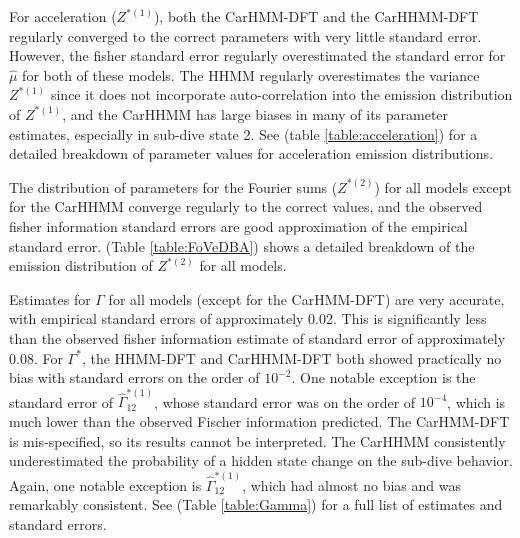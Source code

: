 For acceleration ($Z^{*(1)}$), both the CarHMM-DFT and the CarHHMM-DFT regularly converged to the correct parameters with very little standard error. However, the fisher standard error regularly overestimated the standard error for $\hat \mu$ for both of these models. 
The HHMM regularly overestimates the variance $Z^{*(1)}$ since it does not incorporate auto-correlation into the emission distribution of $Z^{*(1)}$, and the CarHHMM has large biases in many of its parameter estimates, especially in sub-dive state 2. 
See (table \ref{table:acceleration}) for a detailed breakdown of parameter values for acceleration emission distributions.

The distribution of parameters for the Fourier sums ($Z^{*(2)}$) for all models except for the CarHHMM converge regularly to the correct values, and the observed fisher information standard errors are good approximation of the empirical standard error.
(Table \ref{table:FoVeDBA}) shows a detailed breakdown of the emission distribution of $Z^{*(2)}$ for all models.


Estimates for $\Gamma$ for all models (except for the CarHMM-DFT) are very accurate, with empirical standard errors of approximately 0.02. This is significantly less than the observed fisher information estimate of standard error of approximately 0.08.
For $\Gamma^*$, the HHMM-DFT and CarHHMM-DFT both showed practically no bias with standard errors on the order of $10^{-2}$. One notable exception is the standard error of $\hat \Gamma^{*(1)}_{12}$, whose standard error was on the order of $10^{-4}$, which is much lower than the observed Fischer information predicted. The CarHMM-DFT is mis-specified, so its results cannot be interpreted. The CarHHMM consistently underestimated the probability of a hidden state change on the sub-dive behavior. Again, one notable exception is $\hat \Gamma^{*(1)}_{12}$, which had almost no bias and was remarkably consistent. See (Table \ref{table:Gamma}) for a full list of estimates and standard errors.

